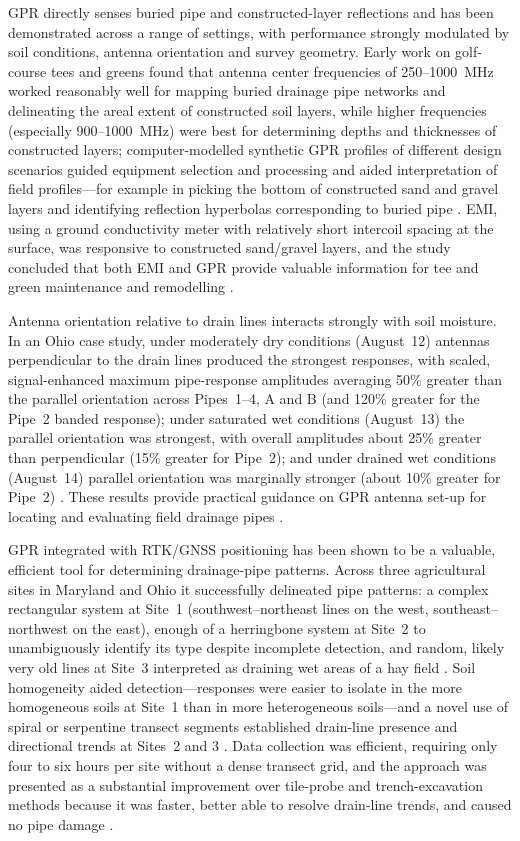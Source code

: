 GPR directly senses buried pipe and constructed-layer reflections and has been demonstrated across a range of settings, with performance strongly modulated by soil conditions, antenna orientation and survey geometry. Early work on golf-course tees and greens found that antenna center frequencies of 250--1000~MHz worked reasonably well for mapping buried drainage pipe networks and delineating the areal extent of constructed soil layers, while higher frequencies (especially 900--1000~MHz) were best for determining depths and thicknesses of constructed layers; computer-modelled synthetic GPR profiles of different design scenarios guided equipment selection and processing and aided interpretation of field profiles---for example in picking the bottom of constructed sand and gravel layers and identifying reflection hyperbolas corresponding to buried pipe \parencite{Allred2005}. EMI, using a ground conductivity meter with relatively short intercoil spacing at the surface, was responsive to constructed sand/gravel layers, and the study concluded that both EMI and GPR provide valuable information for tee and green maintenance and remodelling \parencite{Allred2005}.

Antenna orientation relative to drain lines interacts strongly with soil moisture. In an Ohio case study, under moderately dry conditions (August~12) antennas perpendicular to the drain lines produced the strongest responses, with scaled, signal-enhanced maximum pipe-response amplitudes averaging 50\% greater than the parallel orientation across Pipes~1--4, A and B (and 120\% greater for the Pipe~2 banded response); under saturated wet conditions (August~13) the parallel orientation was strongest, with overall amplitudes about 25\% greater than perpendicular (15\% greater for Pipe~2); and under drained wet conditions (August~14) parallel orientation was marginally stronger (about 10\% greater for Pipe~2) \parencite{Allred2013}. These results provide practical guidance on GPR antenna set-up for locating and evaluating field drainage pipes \parencite{Allred2013}.

GPR integrated with RTK/GNSS positioning has been shown to be a valuable, efficient tool for determining drainage-pipe patterns. Across three agricultural sites in Maryland and Ohio it successfully delineated pipe patterns: a complex rectangular system at Site~1 (southwest--northeast lines on the west, southeast--northwest on the east), enough of a herringbone system at Site~2 to unambiguously identify its type despite incomplete detection, and random, likely very old lines at Site~3 interpreted as draining wet areas of a hay field \parencite{Allred2018b}. Soil homogeneity aided detection---responses were easier to isolate in the more homogeneous soils at Site~1 than in more heterogeneous soils---and a novel use of spiral or serpentine transect segments established drain-line presence and directional trends at Sites~2 and 3 \parencite{Allred2018b}. Data collection was efficient, requiring only four to six hours per site without a dense transect grid, and the approach was presented as a substantial improvement over tile-probe and trench-excavation methods because it was faster, better able to resolve drain-line trends, and caused no pipe damage \parencite{Allred2018b}.

